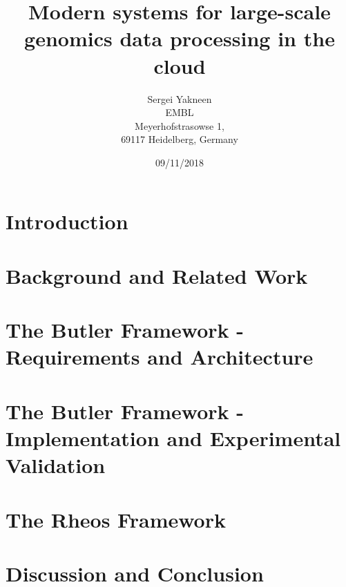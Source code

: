\documentclass[12pt, twoside]{report}
\title{
	{Modern systems for large-scale genomics data processing in the cloud}\\
}
\author{Sergei Yakneen\\ EMBL\\ Meyerhofstrasowse 1,\\ 69117 Heidelberg, Germany}
\date{09/11/2018}
\begin{document}
\maketitle

\tableofcontents

\chapter{Introduction} \label{ch:introduction}


\chapter{Background and Related Work} \label{ch:background}

	 
\chapter{The Butler Framework - Requirements and Architecture} \label{ch:butler_architecture}
%

\chapter{The Butler Framework - Implementation and Experimental Validation} \label{ch:butler_implementation}
%

\chapter{The Rheos Framework} \label{ch:rheos_framework}


\chapter{Discussion and Conclusion} \label{ch:conclusion}


\label{ch:appendices}


\printbibliography
\end{document}
